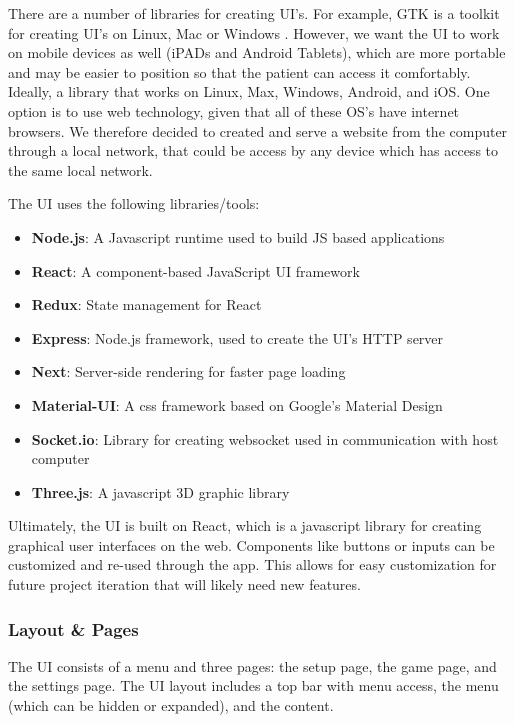 \documentclass[12pt]{report}
\begin{document}
	There are a number of libraries for creating UI's. For example, GTK is a toolkit for creating UI's on Linux, Mac or Windows \cite{TheGTKTeam2019}. However, we want the UI to work on mobile devices as well (iPADs and Android Tablets), which are more portable and may be easier to position so that the patient can access it comfortably. Ideally, a library that works on Linux, Max, Windows, Android, and iOS. One option is to use web technology, given that all of these OS's have internet browsers. We therefore decided to created and serve a website from the computer through a local network, that could be access by any device which has access to the same local network. 
	
	The UI uses the following libraries/tools:
	
	\begin{itemize}
		\item \textbf{Node.js}: A Javascript runtime used to build JS based applications 		
		\item \textbf{React}: A component-based JavaScript UI framework
		\item \textbf{Redux}: State management for React
		\item \textbf{Express}: Node.js framework, used to create the UI's HTTP server
		\item \textbf{Next}: Server-side rendering for faster page loading
		\item \textbf{Material-UI}: A css framework based on Google's Material Design
		\item \textbf{Socket.io}: Library for creating websocket used in communication with host computer
		\item \textbf{Three.js}: A javascript 3D graphic library 
	\end{itemize}
	
	
	Ultimately, the UI is built on React, which is a javascript library for creating graphical user interfaces on the web. Components like buttons or inputs can be customized and re-used through the app. This allows for easy customization for future project iteration that will likely need new features. 
	
		\subsubsection{Layout \& Pages}

The UI consists of a menu and three pages: the setup page, the game page, and the settings page. The UI layout includes a top bar with menu access, the menu (which can be hidden or expanded), and the content. 
\end{document}
